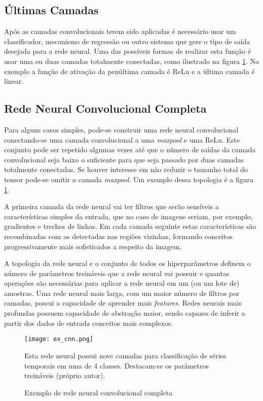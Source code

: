 \subsection{Últimas Camadas}
Após as camadas convolucionais terem sido aplicadas é necessário usar um
classificador, mecanismo de regressão ou outro sistema que gere o tipo de saída
desejada para a rede neural. Uma das possíveis formas de realizar esta função é
usar uma ou duas camadas totalmente conectadas, como ilustrado na figura
\ref{fig:ex_cnn}. No exemplo a função de ativação da penúltima camada é
ReLu e a última camada é linear.

\subsection{Rede Neural Convolucional Completa}
Para alguns casos simples, pode-se construir uma rede neural convolucional
conectando-se uma camada convolucional a uma \emph{maxpool} e uma ReLu. Este
conjunto pode ser repetido algumas vezes até que o número de saídas da camada
convolucional seja baixo o suficiente para que seja passado por duas camadas
totalmente conectadas. Se houver interesse em não reduzir o tamanho total do
tensor pode-se omitir a camada \emph{maxpool}. Um exemplo dessa topologia é a
figura \ref{fig:ex_cnn}.

A primeira camada da rede neural vai ter filtros que serão sensíveis a
características simples da entrada, que no caso de imagens seriam, por exemplo,
gradientes e trechos de linhas. Em
cada camada seguinte estas características são recombinadas com as detectadas
nas regiões vizinhas, formando conceitos progressivamente mais sofisticados a
respeito da imagem.

A topologia da rede neural e o conjunto de todos os hiperparâmetros definem o
número de parâmetros treináveis que a rede neural vai possuir e quantas
operações são necessárias para aplicar a rede neural em um (ou um lote de)
amostras. Uma rede neural mais larga, com um maior número de filtros por
camadas, possui a capacidade de aprender mais \emph{features}. Redes neurais
mais profundas possuem capacidade de abstração maior, sendo capazes de inferir
a partir dos dados de entrada conceitos mais complexos.

\begin{figure}[!htb]
	\centering
	\texttt{[image: ex\_cnn.png]}
	\caption{Exemplo de rede neural convolucional completa}
	\label{fig:ex_cnn}
	Esta rede neural possui nove camadas para
	classificação de séries temporais em uma de 4 classes. Destacam-se os
	parâmetros treináveis (próprio autor).
\end{figure}

